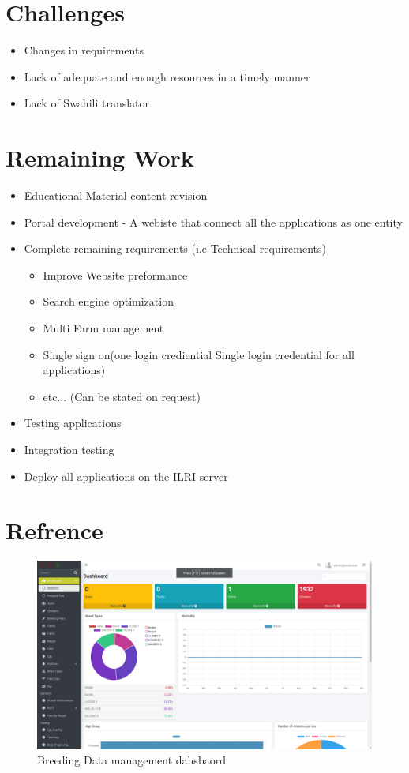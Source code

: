 \documentclass[12pt]{extarticle}
\begin{document}
\section{Challenges}
\begin{itemize}
	\item Changes in requirements
	\item Lack of adequate and enough resources in a timely manner 
	\item Lack of Swahili translator
\end{itemize}

\newpage
\section{Remaining Work}

\begin{itemize}
	\item Educational Material content revision
	\item Portal development - A webiste that connect all the applications as one entity
	\item Complete remaining requirements (i.e Technical requirements)
	\begin{itemize}
		\item Improve Website preformance
		\item Search engine optimization
		\item Multi Farm management 
		\item Single sign on(one login crediential Single login credential for all applications)
		\item etc... (Can be stated on request)
	\end{itemize}
	\item Testing applications
	\item Integration testing
	\item Deploy all applications on the ILRI server
\end{itemize}

\section{Refrence}
\begin{figure}[ht]
\centering
\hspace*{-3cm}
\includegraphics[width=20cm,keepaspectratio]{2.png}
\caption{Breeding Data management dahsbaord}
\end{figure}
\end{document}
